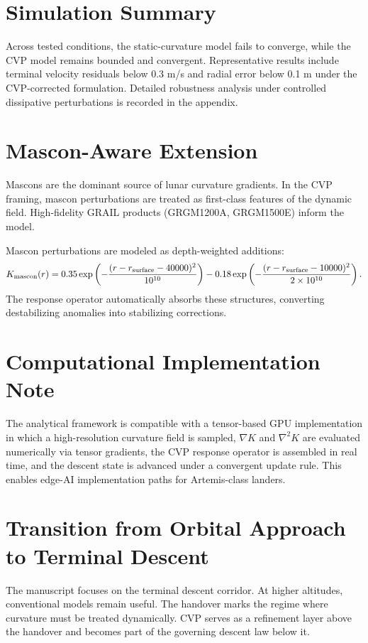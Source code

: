 \documentclass[11pt,a4paper]{article}
\begin{document}
\section{Simulation Summary}
Across tested conditions, the static-curvature model fails to converge, while the CVP model remains bounded and convergent. Representative results include terminal velocity residuals below 0.3 m/s and radial error below 0.1 m under the CVP-corrected formulation. Detailed robustness analysis under controlled dissipative perturbations is recorded in the appendix.

\section{Mascon-Aware Extension}
Mascons are the dominant source of lunar curvature gradients. In the CVP framing, mascon perturbations are treated as first-class features of the dynamic field. High-fidelity GRAIL products (GRGM1200A, GRGM1500E) inform the model.

Mascon perturbations are modeled as depth-weighted additions:
\[
K_{\rm mascon}(r) = 0.35 \exp\left(-\frac{(r - r_{\rm surface} - 40000)^2}{10^{10}}\right) - 0.18 \exp\left(-\frac{(r - r_{\rm surface} - 10000)^2}{2 \times 10^{10}}\right).
\]
The response operator automatically absorbs these structures, converting destabilizing anomalies into stabilizing corrections.

\section{Computational Implementation Note}
The analytical framework is compatible with a tensor-based GPU implementation in which a high-resolution curvature field is sampled, \(\nabla K\) and \(\nabla^2 K\) are evaluated numerically via tensor gradients, the CVP response operator is assembled in real time, and the descent state is advanced under a convergent update rule. This enables edge-AI implementation paths for Artemis-class landers.

\section{Transition from Orbital Approach to Terminal Descent}
The manuscript focuses on the terminal descent corridor. At higher altitudes, conventional models remain useful. The handover marks the regime where curvature must be treated dynamically. CVP serves as a refinement layer above the handover and becomes part of the governing descent law below it.
\end{document}
